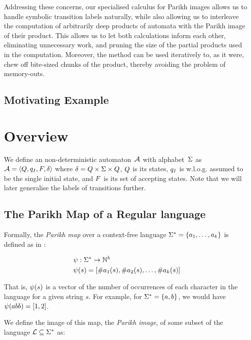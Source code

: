 \documentclass{easychair}
\theoremstyle{definition}
\begin{document}
Addressing these concerns, our specialised calculus for Parikh images allows us to handle symbolic transition labels naturally, while also allowing us to interleave the computation of arbitrarily deep products of automata with the Parikh image of their product. This allows us to let both calculations inform each other, eliminating unnecessary work, and pruning the size of the partial products used in the computation. Moreover, the method can be used iteratively to, as it were, chew off bite-sized chunks of the product, thereby avoiding the problem of memory-outs.

\subsection{Motivating Example}

\section{Overview}

We define an non-deterministic automaton~$\mathcal{A}$ with alphabet~$\Sigma$
as $\mathcal{A} = \left\langle Q, q_I, F, \delta\right\rangle$ where
$\delta = Q \times \Sigma \times Q$, $Q$ is its
states, $q_I$ is w.l.o.g. assumed to be the single initial state, and
$F$ is its set of accepting states. Note that we will later generalise
the labels of transitions further.

\subsection{The Parikh Map of a Regular language}
Formally, the \textit{Parikh map} over a context-free language $\Sigma^*=
\left\{a_1, \ldots, a_k \right\}$ is defined as in \cite{kozen}:

$$
\begin{aligned}
& \operatorname{\psi}: \Sigma^* \rightarrow \mathbb{N}^k \\
& \operatorname{\psi}(s) = \left[\#a_1(s), \#a_2(s), \ldots, \#a_k(s)\right]
\end{aligned}
$$

That is, $\operatorname{\psi}(s)$ is a vector of the number of occurrences of each
character in the language for a given string $s$. For example, for  $\Sigma^* =
\left\{a, b\right\}$, we would have $\operatorname{\psi}(abb) = \left[1, 2\right]$.

We define the image of this map, the \textit{Parikh image}, of some subset of
the language $\operatorname{\mathcal{L}} \subseteq \Sigma^*$ as:
\end{document}
